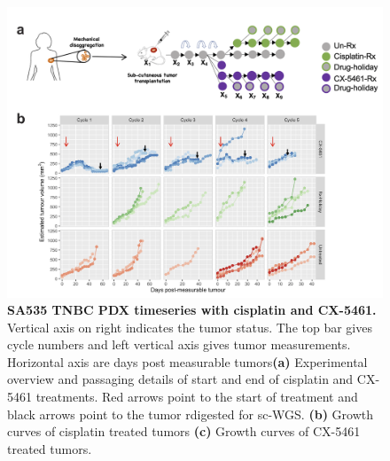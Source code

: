 \begin{figure}
\centering
\includegraphics[width=\textwidth]{Figures/chap4/SA535CX5461.png}
	
\caption[SA535 TNBC PDX timeseries with CX-5461]
	{\small
 \textbf{SA535 TNBC PDX timeseries with cisplatin and CX-5461.}
Vertical axis on right indicates the tumor status. The top bar gives cycle numbers and left vertical axis gives tumor measurements. Horizontal axis are days post measurable tumors\textbf{(a)} Experimental overview and passaging details of start and end of cisplatin and CX-5461 treatments. Red arrows point to the start of treatment and black arrows point to the tumor rdigested for sc-WGS.
	   \textbf{(b)} Growth curves of cisplatin treated tumors
	    \textbf{(c)} Growth curves of CX-5461 treated tumors.
	}
	\label{fig:SA535CX5461}
\end{figure}



